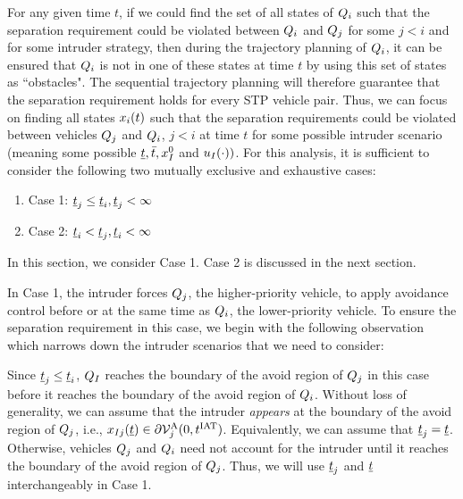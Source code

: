 For any given time $t$, if we could find the set of all states of $Q_i$ such that the separation requirement could be violated between $Q_i$ and $Q_j$ for some $j<i$ and for some intruder strategy, then during the trajectory planning of $Q_i$, it can be ensured that $Q_i$ is not in one of these states at time $t$ by using this set of states as ``obstacles". The sequential trajectory planning will therefore guarantee that the separation requirement holds for every STP vehicle pair. Thus, we can focus on finding all states $x_i(t)$ such that the separation requirements could be violated between vehicles $Q_j$ and $Q_i$, $j <i$ at time $t$ for some possible intruder scenario (meaning some possible $\underline{t}, \bar{t}, x_{I}^0$ and $u_{I}(\cdot))$. For this analysis, it is sufficient to consider the following two mutually exclusive and exhaustive cases: 
\begin{enumerate}
\item Case 1: $\underline{t}_j \leq \underline{t}_i, \underline{t}_j < \infty$
\item Case 2: $\underline{t}_i < \underline{t}_j, \underline{t}_i <\infty$
\end{enumerate}
In this section, we consider Case 1. Case 2 is discussed in the next section.  

In Case 1, the intruder forces $Q_j$, the higher-priority vehicle, to apply avoidance control before or at the same time as $Q_i$, the lower-priority vehicle. %
To ensure the separation requirement in this case, we begin with the following observation which narrows down the intruder scenarios that we need to consider:
\begin{observation} \label{obs1_case1}
Since $\underline{t}_j \leq \underline{t}_i$, $Q_{I}$ reaches the boundary of the avoid region of $Q_j$ in this case before it reaches the boundary of the avoid region of $Q_i$. Without loss of generality, we can assume that the intruder \textit{appears} at the boundary of the avoid region of $Q_j$, i.e., $x_{I j}(\underline{t}) \in \partial \mathcal{V}^{\text{A}}_{j}(0, t^\text{IAT})$. Equivalently, we can assume that $\underline{t}_j = \underline{t}$. Otherwise, vehicles $Q_j$ and $Q_i$ need not account for the intruder until it reaches the boundary of the avoid region of $Q_j$. Thus, we will use $\underline{t}_j$ and $\underline{t}$ interchangeably in Case 1.
\end{observation}